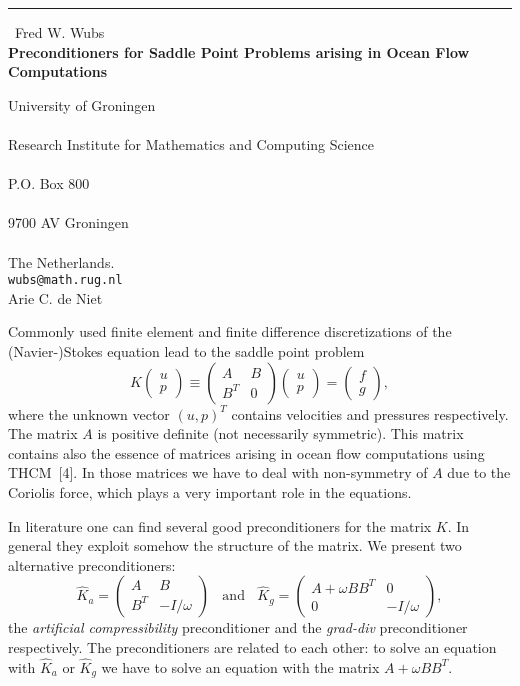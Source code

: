 \documentclass{report}
\begin{document}
\begin{center}
\rule{6in}{1pt} \
{\large Fred W. Wubs \\
{\bf Preconditioners for Saddle Point Problems arising in Ocean Flow Computations}}

University of Groningen \\  \\ Research Institute for Mathematics and Computing Science \\  \\ P.O. Box 800 \\  \\ 9700 AV Groningen \\ \\ The Netherlands.
\\
{\tt wubs@math.rug.nl}\\
Arie C. de Niet\end{center}

Commonly used finite element and finite difference discretizations of the
(Navier-)Stokes equation lead to the saddle point problem
\[
K \left(\begin{array}{c}
u \\ p \end{array}\right)\equiv
\left(\begin{array}{cc}
A & B\\ B^T & 0 \end{array}\right)
\left(\begin{array}{c}
u \\ p \end{array}\right)=
\left(\begin{array}{c}
f \\ g \end{array}\right),
\]
where the unknown vector $(u,p)^T$ contains velocities and
pressures respectively. The matrix $A$ is positive definite (not
necessarily symmetric). This matrix contains also the essence of
matrices arising in ocean flow computations using THCM~[4]. In
those matrices we have to deal with non-symmetry of $A$ due to the
Coriolis force, which plays a very important role in the
equations.

In literature one can find several good preconditioners for the matrix
$K$. In general they exploit somehow the structure of the matrix. We
present two alternative preconditioners:
\[
\hat K_a = \left(\begin{array}{cc} A & B\\ B^T & -I/\omega \end{array}\right)
\;\;\mbox{ and } \;\;
\hat K_g = \left(\begin{array}{cc} A +\omega BB^T & 0\\ 0 & -I/\omega \end{array}\right),
\]
the {\it artificial compressibility} preconditioner and the {\it
grad-div} preconditioner respectively. The preconditioners are related to each other: to
solve an equation with $\hat K_a$ or $\hat K_g$ we have to solve an equation
with the matrix $A+\omega B B^T$.
\end{document}

